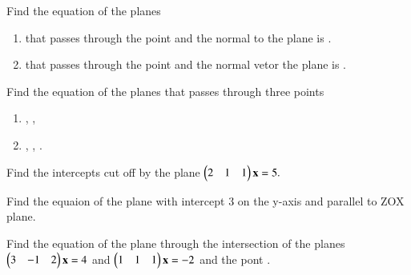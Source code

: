 %
\item Find the equation of the planes
\begin{enumerate}
\item that passes through the point  and the normal to the plane is .
\\
\solution

\item that passes through the point  and the normal vetor the plane is .
\solution


\end{enumerate}
\item Find the equation of the planes that passes through three points
\begin{enumerate}
\item {}, , 
\item {}, , .
\end{enumerate}
\item Find the intercepts cut off by the plane 
$
\begin{pmatrix}2 & 1 & 1\end{pmatrix}\mathbf{x}=5.
$
\item Find the equaion of the plane with intercept 3 on the y-axis and parallel to ZOX plane.
\item Find the equation of the plane through the intersection of the planes 
$
\begin{pmatrix}3 & -1 & 2\end{pmatrix}\mathbf{x}=4
$
 and 
$
\begin{pmatrix}1 & 1 & 1\end{pmatrix}\mathbf{x}=-2
$
and the pont .
%
\\
\solution


